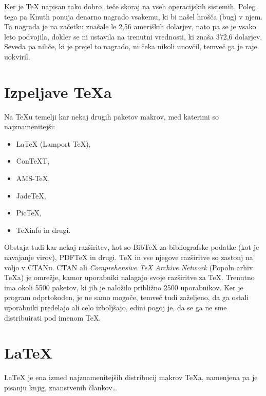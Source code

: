 \documentclass[a4paper]{book}
\begin{document}
Ker je \TeX{} napisan tako dobro, teče skoraj na vseh operacijskih sistemih. Poleg tega pa Knuth ponuja denarno nagrado vsakemu, ki bi našel hrošča (bug) v njem. Ta nagrada je na začetku znašale le 2,56 ameriških dolarjev, nato pa se je vsako leto podvojila, dokler se ni ustavila na trenutni vrednosti, ki znaša 372,6 dolarjev. Seveda pa nihče, ki je prejel to nagrado, ni čeka nikoli unovčil, temveč ga je raje uokviril.


\chapter{Izpeljave \TeX{}a}
Na \TeX{}u temelji kar nekaj drugih paketov makrov, med katerimi so najznamenitejši:
\begin{itemize}
\item \LaTeX{} (Lamport \TeX{}),
\item Con\TeX{}T,
\item AMS-\TeX{},
\item Jade\TeX{},
\item Pic\TeX{},
\item \TeX{}info in drugi.
\end{itemize}

Obstaja tudi kar nekaj razširitev, kot so Bib\TeX{} za bibliografske podatke (kot je navajanje virov), PDF\TeX{} in drugi.
\TeX{} in vse njegove razširitve so zastonj na voljo v CTANu. CTAN ali \textit{Comprehensive \TeX{} Archive Network} (Popoln arhiv \TeX{}a) je omrežje, kamor uporabniki nalagajo svoje razširitve za \TeX{}. Trenutno ima okoli 5500 paketov, ki jih je naložilo približno 2500 uporabnikov.
Ker je program odprtokoden, je ne samo mogoče, temveč tudi zaželjeno, da ga ostali uporabniki predelajo ali celo izboljšajo, edini pogoj je, da se ga ne sme distribuirati pod imenom \TeX{}.


\chapter{\LaTeX{}}
\LaTeX{} je ena izmed najznamenitejših distribucij makrov \TeX{}a, namenjena pa je pisanju knjig, znanstvenih člankov\ldots

\end{document}
